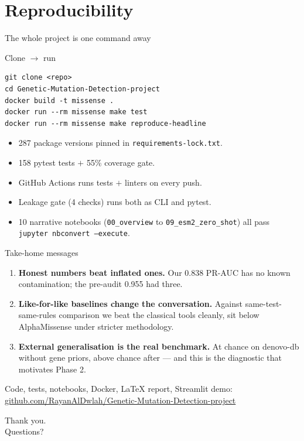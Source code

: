 \documentclass[aspectratio=169]{beamer}
\begin{document}

\section{Reproducibility}

\begin{frame}{The whole project is one command away}
  \vspace{0.5em}
  \begin{block}{Clone $\to$ run}
  \small
  \begin{verbatim}
git clone <repo>
cd Genetic-Mutation-Detection-project
docker build -t missense .
docker run --rm missense make test
docker run --rm missense make reproduce-headline
  \end{verbatim}
  \end{block}
  \vspace{0.3em}
  \begin{itemize}
    \item 287 package versions pinned in \texttt{requirements-lock.txt}.
    \item 158 pytest tests $+$ 55\% coverage gate.
    \item GitHub Actions runs tests $+$ linters on every push.
    \item Leakage gate (4 checks) runs both as CLI and pytest.
    \item 10 narrative notebooks (\texttt{00\_overview} to
          \texttt{09\_esm2\_zero\_shot}) all pass
          \texttt{jupyter nbconvert --execute}.
  \end{itemize}
\end{frame}


\begin{frame}{Take-home messages}
  \begin{enumerate}
    \item \textbf{Honest numbers beat inflated ones.}
          Our 0.838 PR-AUC has no known contamination; the
          pre-audit 0.955 had three.
    \item \textbf{Like-for-like baselines change the conversation.}
          Against same-test-same-rules comparison we beat the
          classical tools cleanly, sit below AlphaMissense under
          stricter methodology.
    \item \textbf{External generalisation is the real benchmark.}
          At chance on denovo-db without gene priors, above chance
          after --- and this is the diagnostic that motivates Phase
          2.
  \end{enumerate}
  \vspace{1em}
  \centering
  \small
  Code, tests, notebooks, Docker, LaTeX report, Streamlit demo: \\
  \url{github.com/RayanAlDwlah/Genetic-Mutation-Detection-project}
\end{frame}

\begin{frame}[plain]{}
  \vspace{2cm}
  \centering
  {\Huge Thank you.}\\[2em]
  {\Large Questions?}
\end{frame}
\end{document}
